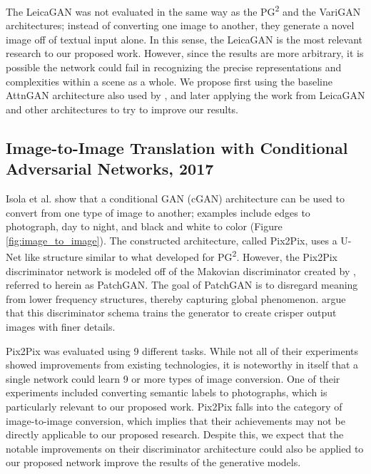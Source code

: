 \documentclass{article}
\begin{document}
The LeicaGAN was not evaluated in the same way as the PG\textsuperscript{2} and
the VariGAN architectures; instead of converting one image to another, they
generate a novel image off of textual input alone. In this sense, the LeicaGAN
is the most relevant research to our proposed work. However, since the results
are more arbitrary, it is possible the network could fail in recognizing the
precise representations and complexities within a scene as a whole.
We propose first using the baseline AttnGAN architecture also used by 
\cite{leica}, and later applying the work from LeicaGAN and other architectures 
to try to improve our results.

\subsection*{Image-to-Image Translation with Conditional Adversarial Networks, 2017}
\nocite{image_to_image}
Isola et al. show that a conditional GAN (cGAN) architecture can be used to
convert from one type of image to another; examples include edges to photograph,
day to night, and black and white to color (Figure \ref{fig:image_to_image}).
The constructed architecture, called
Pix2Pix, uses a U-Net like structure similar to what
\cite{pose_guided_image_generation} developed for
PG\textsuperscript{2}. However, the Pix2Pix discriminator network is modeled off
of the Makovian discriminator created by \cite{markovian},
referred to herein as PatchGAN.
The goal of PatchGAN is to disregard meaning from lower frequency structures,
thereby capturing global phenomenon. \cite{image_to_image}
argue that this discriminator
schema trains the generator to create crisper output images with finer details.

Pix2Pix was evaluated using 9 different tasks. While not all of their
experiments showed improvements from existing technologies, it is noteworthy
in itself that a single network could learn 9 or more types of image conversion.
One of their experiments included converting semantic labels to photographs,
which is particularly relevant to our proposed work.
Pix2Pix falls into the category of image-to-image conversion, which implies that
their achievements may not be directly applicable to our proposed research.
Despite this, we expect that the notable improvements on their discriminator 
architecture could also be applied to our proposed network improve the results
of the generative models.
\end{document}
